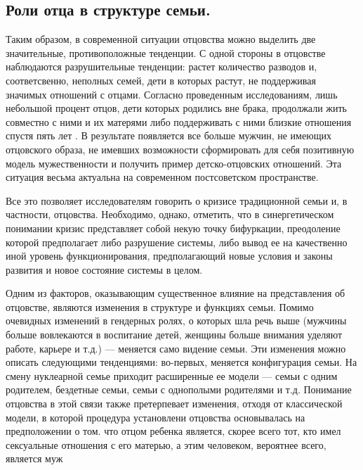 \documentclass{../../common/thesisbyxetex}
\begin{document}
\subsection{Роли отца в структуре семьи.}


Таким образом, в современной ситуации отцовства можно выделить две значительные, противоположные
тенденции. С одной стороны  в отцовстве наблюдаются разрушительные тенденции: растет количество
разводов и, соответсвенно, неполных семей, дети в которых растут, не поддерживая значимых отношений
с отцами. Согласно проведенным исследованиям, лишь небольшой процент отцов, дети которых
родились вне брака, продолжали жить совместно с ними и их матерями либо поддерживать с ними близкие
отношения спустя пять лет \cite{long}. В результате появляется все больше мужчин, не имеющих
отцовского образа, не имевших возможности сформировать для себя позитивную модель мужественности и
получить пример детско-отцовских отношений. Эта ситуация весьма актуальна на современном
постсоветском пространстве.



Все это позволяет исследователям говорить о кризисе традиционной семьи и, в частности, отцовства.
Необходимо, однако, отметить, что в синергетическом понимании кризис представляет собой некую точку
бифуркации, преодоление которой предполагает либо разрушение системы, либо вывод ее на качественно
иной уровень функционирования, предполагающий новые условия и законы развития и новое состояние
системы в целом.

Одним из факторов, оказывающим существенное влияние на представления об отцовстве, являются
изменения в структуре и функциях семьи. Помимо очевидных изменений в гендерных ролях, о которых шла
речь выше (мужчины больше вовлекаются в воспитание детей, женщины больше внимания уделяют
работе,
карьере и т.д.) --- меняется само видение семьи. Эти изменения можно описать следующими
тенденциями: во-первых, меняется конфигурация семьи. На смену нуклеарной семье приходит расширенные
ее модели --- семьи с одним родителем, бездетные семьи, семьи с однополыми родителями и т.д.
Понимание отцовства
в этой связи также претерпевает изменения, отходя от классической модели, в которой процедура
установлени отцовства основывалась на предположении о том. что отцом ребенка является, скорее всего
 тот, кто имел сексуальные отношения с его матерью, а этим человеком, вероятнее всего,
является муж \cite[318]{legfat}
\end{document}
